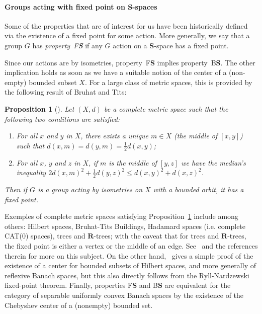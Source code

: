 \documentclass[a4paper]{article}
\newtheorem{prop}[lem]{Proposition}
\theoremstyle{definition}
\newcommand*{\field}[1]{\mathbf{#1}}
\newcommand*{\category}[1]{\textbf{#1}}
\newcommand*{\CatS}{\category{S}}
\newcommand*{\R}{\field{R}}
\newcommand*{\BS}{B\textbf{S}}
\newcommand*{\FS}{F\textbf{S}}
\begin{document}
\paragraph{Groups acting with fixed point on \CatS-spaces}
Some of the properties that are of interest for us have been historically defined via the existence of a fixed point for some action.
More generally, we say that a group $G$ has \emph{property~\FS} if any $G$ action on a \CatS-space has a fixed point.

Since our actions are by isometries, property~\FS{} implies property~\BS. The other implication holds as soon as we have a suitable notion of the center of a (non-empty) bounded subset $X$.
For a large class of metric spaces, this is provided by the following result of Bruhat and Tits:
%
%
\begin{prop}[{\cite[Chapter 3.b]{MR1023471}}]\label{Proposition:Mediane}
Let $(X,d)$ be a complete metric space such that the following two conditions are satisfied:
\begin{enumerate}
\item For all $x$ and $y$ in $X$, there exists a unique $m\in X$ (the middle of $[x,y]$) such that $d(x,m)=d(y,m)=\frac12d(x,y)$;
\item For all $x$, $y$ and $z$ in $X$, if $m$ is the middle of $[y,z]$ we have the median's inequality  $2d(x,m)^2+\frac12d(y,z)^2\leq d(x,y)^2+d(x,z)^2$.
\end{enumerate}
Then if $G$ is a group acting by isometries on $X$ with a bounded orbit, it has a fixed point.
\end{prop}
%
%
Exemples of complete metric spaces satisfying Proposition~\ref{Proposition:Mediane} include among others: Hilbert spaces, Bruhat-Tits Buildings, Hadamard spaces (i.e. complete CAT(0) spaces), trees and $\R$-trees; with the caveat that for trees and $\R$-trees, the fixed point is either a vertex or the middle of an edge.
See~\cite[Chapter 3.b]{MR1023471} and the references therein for more on this subject.
On the other hand,~\cite[Lemma 2.2.7]{MR2415834} gives a simple proof of the existence of a center for bounded subsets of Hilbert spaces, and more generally of reflexive Banach spaces, but this also directly follows from the Ryll-Nardzewski fixed-point theorem.
Finally, properties \FS{} and \BS{} are equivalent for the category of separable  uniformly  convex Banach  spaces by the existence of the Chebyshev center of a (nonempty) bounded set.
\end{document}
